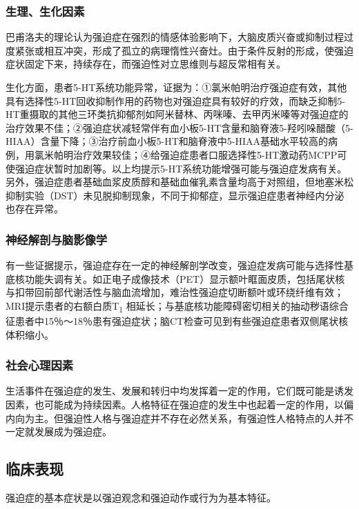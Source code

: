 \subsubsection{生理、生化因素}

巴甫洛夫的理论认为强迫症在强烈的情感体验影响下，大脑皮质兴奋或抑制过程过度紧张或相互冲突，形成了孤立的病理惰性兴奋灶。由于条件反射的形成，使强迫症状固定下来，持续存在，而强迫性对立思维则与超反常相有关。

生化方面，患者5-HT系统功能异常，证据为：①氯米帕明治疗强迫症有效，其他具有选择性5-HT回收抑制作用的药物也对强迫症具有较好的疗效，而缺乏抑制5-HT重摄取的其他三环类抗抑郁剂如阿米替林、丙咪嗪、去甲丙米嗪等对强迫症的治疗效果不佳；②强迫症状减轻常伴有血小板5-HT含量和脑脊液5-羟吲哚醋酸（5-HIAA）含量下降；③治疗前血小板5-HT和脑脊液中5-HIAA基础水平较高的病例，用氯米帕明治疗效果较佳；④给强迫症患者口服选择性5-HT激动药MCPP可使强迫症状暂时加剧等。以上均提示5-HT系统功能增强可能与强迫症发病有关。另外，强迫症患者基础血浆皮质醇和基础血催乳素含量均高于对照组，但地塞米松抑制实验（DST）未见脱抑制现象，不同于抑郁症，显示强迫症患者神经内分泌也存在异常。

\subsubsection{神经解剖与脑影像学}

有一些证据提示，强迫症存在一定的神经解剖学改变，强迫症发病可能与选择性基底核功能失调有关。如正电子成像技术（PET）显示额叶眶面皮质，包括尾状核与扣带回前部代谢活性与脑血流增加，难治性强迫症切断额叶或环绕纤维有效；MRI提示患者的右额白质T\textsubscript{1}
相延长；与基底核功能障碍密切相关的抽动秽语综合征患者中15％～18％患有强迫症状；脑CT检查可见到有些强迫症患者双侧尾状核体积缩小。

\subsubsection{社会心理因素}

生活事件在强迫症的发生、发展和转归中均发挥着一定的作用，它们既可能是诱发因素，也可能成为持续因素。人格特征在强迫症的发生中也起着一定的作用，以偏内向为主。但强迫性人格与强迫症并不存在必然关系，有强迫性人格特点的人并不一定就发展成为强迫症。

\subsection{临床表现}

强迫症的基本症状是以强迫观念和强迫动作或行为为基本特征。

